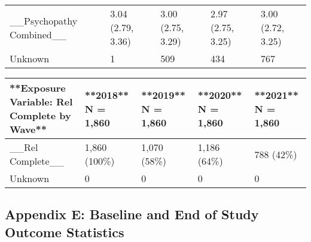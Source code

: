 \documentclass[
  singlecolumn]{article}
\begin{document}
\begin{table}
\begin{tabular}[t]{lllll}
\_\_Psychopathy Combined\_\_ & 3.04 (2.79, 3.36) & 3.00 (2.75, 3.29) & 2.97 (2.75, 3.25) & 3.00 (2.72, 3.25)\\
Unknown & 1 & 509 & 434 & 767\\
\bottomrule
\end{tabular}
\centering
\begin{tabular}[t]{lllll}
\toprule
**Exposure Variable: Rel Complete by Wave** & **2018**  
N = 1,860 & **2019**  
N = 1,860 & **2020**  
N = 1,860 & **2021**  
N = 1,860\\
\midrule
\_\_Rel Complete\_\_ & 1,860 (100\%) & 1,070 (58\%) & 1,186 (64\%) & 788 (42\%)\\
Unknown & 0 & 0 & 0 & 0\\
\bottomrule
\end{tabular}
\end{table}

\newpage{}

\subsection{Appendix E: Baseline and End of Study Outcome
Statistics}\label{appendix-outcomes}
\end{document}
